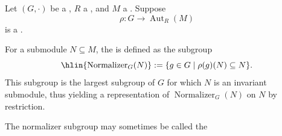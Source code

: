 
\begin{definition} \label{definition:normalizer_subgroup_of_a_group_representation_on_a_submodule}
Let $(G, \cdot)$ be a , $R$ a , and $M$ a . Suppose 
$$\rho : G \to \operatorname{Aut}_R(M)$$
is a .

For a submodule $N \subseteq M$, the  is defined as the subgroup
$$\hlin{\operatorname{Normalizer}_G(N)} := \{ g \in G \mid \rho(g)(N) \subseteq N \}.$$
This subgroup is the largest subgroup of $G$ for which $N$ is an invariant submodule, thus yielding a representation of $\operatorname{Normalizer}_G(N)$ on $N$ by restriction.

The normalizer subgroup may sometimes be called the 
\end{definition}
